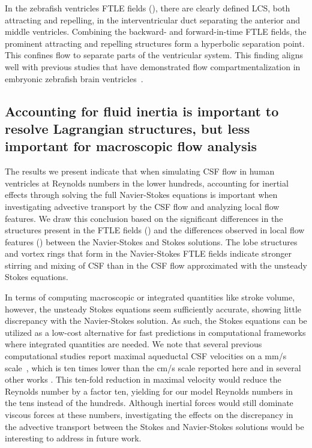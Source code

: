 \documentclass{template}
\begin{document}
In the zebrafish ventricles FTLE fields (),
there are clearly defined LCS, both attracting and repelling,
in the interventricular duct separating the anterior and middle ventricles.
Combining the backward- and forward-in-time FTLE fields,
the prominent attracting and repelling structures form a hyperbolic separation point. 
This confines flow to separate parts of the ventricular system.
This finding aligns well with previous studies that have demonstrated flow
compartmentalization in embryonic zebrafish
brain ventricles~\citep{Olstad2019CiliaryDevelopment,
Herlyng2025AdvectionDiffusion}.

\subsection{Accounting for fluid inertia is important to resolve Lagrangian structures,
but less important for macroscopic flow analysis}
The results we present indicate that when simulating CSF flow
in human ventricles at Reynolds numbers in the lower hundreds,
accounting for inertial effects through
solving the full Navier-Stokes equations is important when investigating
advective transport by the CSF flow and analyzing local flow features.
We draw this conclusion based on the significant differences in the structures
present in the FTLE fields () and the
differences observed in local flow features ()
between the Navier-Stokes and Stokes solutions. The lobe structures and
vortex rings that form in the Navier-Stokes FTLE fields
indicate stronger stirring and mixing of
CSF than in the CSF flow approximated with the unsteady Stokes equations.

In terms of computing macroscopic or integrated quantities like stroke volume,
however, the unsteady Stokes equations seem sufficiently accurate, showing little discrepancy with
the Navier-Stokes solution. As such, the Stokes equations can be
utilized as a low-cost alternative for fast predictions
in computational frameworks where integrated quantities are needed.
We note that several previous computational studies report maximal aqueductal
CSF velocities on a mm/s scale~\citep{enzmann1993cerebrospinal, enzmann1991normal,
Causemann2022HumanFramework, Sweetman2011ThreeDimensional, howden2008three, wagshul2011pulsating,
greitz1993pulsatile, sweetman2011cerebrospinal}, which is ten times lower than the
cm/s scale reported here and in several other works
\citep{kim1999quantitative, nitz1992flow, Kurtcuoglu2007ComputationalSylvius}. 
This ten-fold reduction in maximal velocity would reduce the Reynolds number
by a factor ten, yielding for our model Reynolds numbers in the tens instead of the hundreds.
Although inertial forces would still dominate viscous forces at 
these numbers, investigating the effects on the discrepancy in the advective transport
between the Stokes and Navier-Stokes solutions would be interesting to address in future work.
\end{document}
